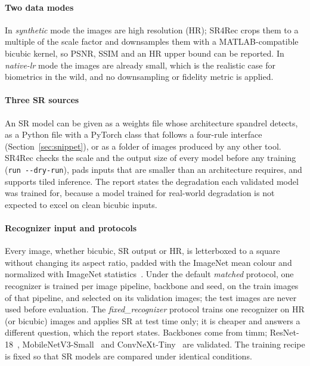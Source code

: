 \documentclass[preprint,12pt]{elsarticle}
\begin{document}
\paragraph{Two data modes} In \emph{synthetic} mode the images are high resolution (HR); SR4Rec
crops them to a multiple of the scale factor and downsamples them with a MATLAB-compatible bicubic
kernel, so PSNR, SSIM and an HR upper bound can be reported. In \emph{native-lr} mode the images
are already small, which is the realistic case for biometrics in the wild, and no downsampling or
fidelity metric is applied.

\paragraph{Three SR sources} An SR model can be given as a weights file whose architecture spandrel
detects, as a Python file with a PyTorch class that follows a four-rule interface
(Section~\ref{sec:snippet}), or as a folder of images produced by any other tool. SR4Rec checks the
scale and the output size of every model before any training (\texttt{run -{}-dry-run}), pads inputs
that are smaller than an architecture requires, and supports tiled inference. The report states the
degradation each validated model was trained for, because a model trained for real-world degradation
is not expected to excel on clean bicubic inputs.

\paragraph{Recognizer input and protocols} Every image, whether bicubic, SR output or HR, is
letterboxed to a square without changing its aspect ratio, padded with the ImageNet mean colour and
normalized with ImageNet statistics~\cite{deng2009imagenet}. Under the default \emph{matched}
protocol, one recognizer is trained per image pipeline, backbone and seed, on the train images of that
pipeline, and selected on its validation images; the test images are never used before evaluation.
The \emph{fixed\_recognizer} protocol trains one recognizer on HR (or bicubic) images and applies
SR at test time only; it is cheaper and answers a different question, which the report states.
Backbones come from timm; ResNet-18~\cite{he2016resnet}, MobileNetV3-Small~\cite{howard2019mobilenetv3}
and ConvNeXt-Tiny~\cite{liu2022convnext} are validated. The training recipe is fixed so that SR
models are compared under identical conditions.
\end{document}

